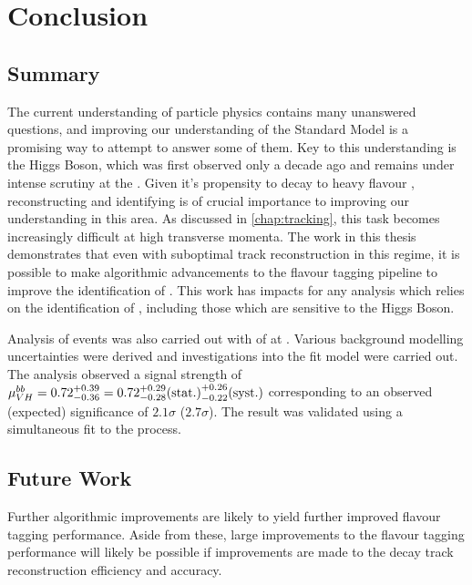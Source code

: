 \chapter{Conclusion}
\label{chap:conclusion}

\section{Summary}\label{sec:conc-summary}

The current understanding of particle physics contains many unanswered questions, and improving our understanding of the Standard Model is a promising way to attempt to answer some of them.
Key to this understanding is the Higgs Boson, which was first observed only a decade ago and remains under intense scrutiny at the \LHC.
Given it's propensity to decay to heavy flavour \bquarks, reconstructing and identifying \bjets is of crucial importance to improving our understanding in this area.
As discussed in \cref{chap:tracking}, this task becomes increasingly difficult at high transverse momenta.
The work in this thesis demonstrates that even with suboptimal track reconstruction in this regime, it is possible to make algorithmic advancements to the flavour tagging pipeline to improve the identification of \bjets.
This work has impacts for any analysis which relies on the identification of \bjets, including those which are sensitive to the Higgs Boson.

Analysis of \VHbb events was also carried out with \intlumi of \runtwo \ATLAS at .
Various background modelling uncertainties were derived and investigations into the fit model were carried out.
The analysis observed a signal strength of 
$\mu_{VH}^{bb} = 0.72 ^{+0.39}_{-0.36} = 0.72 ^{+0.29}_{-0.28} \mathrm{(stat.)} ^{+0.26}_{-0.22} \mathrm{(syst.)}$
corresponding to an observed (expected) significance of $2.1\sigma$ ($2.7\sigma$).
The result was validated using a simultaneous fit to the \VZbb process.



\section{Future Work}\label{sec:conc-future}

Further algorithmic improvements are likely to yield further improved flavour tagging performance.
Aside from these, large improvements to the flavour tagging performance will likely be possible if improvements are made to the \bhadron decay track reconstruction efficiency and accuracy.

